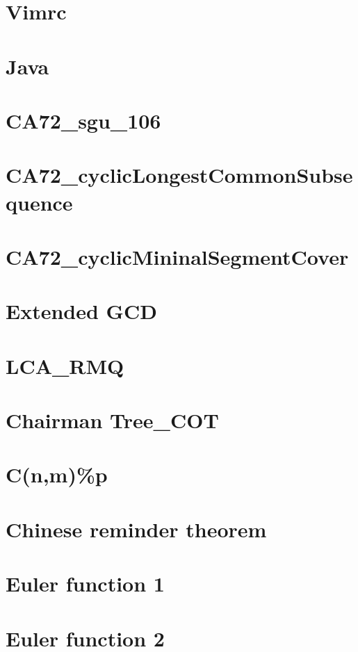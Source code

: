 \documentclass[10pt, a4paper]{article}
\begin{document}
	\section{Vimrc}
	
	\section{Java}
	
	\section{CA72\_sgu\_106}
	
	\section{CA72\_cyclicLongestCommonSubsequence}
	
	\section{CA72\_cyclicMininalSegmentCover}
	
	\section{Extended GCD}
	
	\section{LCA\_RMQ}
	
	\section{Chairman Tree\_COT}
	
	\section{C(n,m)\%p}
	
	\section{Chinese reminder theorem}
	
	\section{Euler function 1}
	
	\section{Euler function 2}
	
\end{document}

